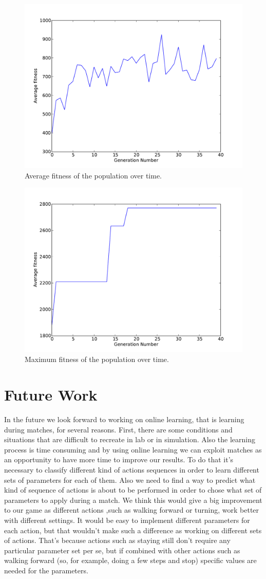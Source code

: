 \documentclass[a4paper, twocolumn]{article}
\begin{document}
\begin{figure}
	\center
	\includegraphics[width=.5\textwidth]{images/fitness}
	\caption{Average fitness of the population over time.}
	\label{fig:avg}
\end{figure}

\begin{figure}
	\center
	\includegraphics[width=.5\textwidth]{images/max_fitness}
	\caption{Maximum fitness of the population over time.}
	\label{fig:max}
\end{figure}


 

\section{Future Work}
 

In the future we look forward to working on online learning, that is learning during matches, for several reasons. First, there are some conditions and situations that are difficult to recreate in lab or in simulation. Also the learning process is time consuming and by using online learning we can exploit matches as an opportunity to have more time to improve our results. To do that it's necessary to classify different kind of actions sequences in order to learn different sets of parameters for each of them. Also we need to find a way to predict what kind of sequence of actions is about to be performed in order to chose what set of parameters to apply during a match. We think this would give a big improvement to our game as different actions ,such as walking forward or turning, work better with different settings. It would be easy to implement different parameters for each action, but that wouldn't make such a difference as working on different sets of actions. That's because actions such as staying still don't require any particular parameter set per se, but if combined with other actions such as walking forward (so, for example, doing a few steps and stop) specific values are needed for the parameters. 




\end{document}
